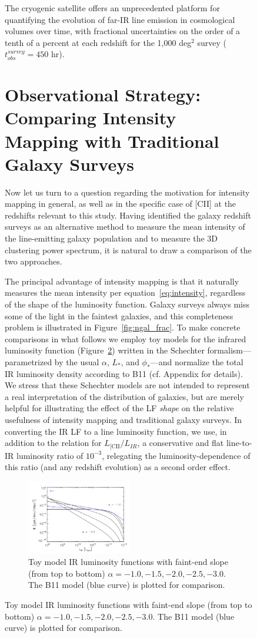 \documentclass[iop,twocolappendix]{emulateapj}
\begin{document}
\begin{figure}[t]
The cryogenic satellite offers an unprecedented platform for quantifying the evolution of far-IR line emission in cosmological volumes over time, with fractional uncertainties on the order of a tenth of a percent at each redshift for the 1,000 deg$^2$ survey ($t_{obs}^{survey} = 450$ hr).

\section{Observational Strategy: Comparing Intensity Mapping with Traditional Galaxy Surveys}

Now let us turn to a question regarding the motivation for intensity mapping in general, as well as in the specific case of [CII] at the redshifts relevant to this study. Having identified the galaxy redshift surveys as an alternative method to measure the mean intensity of the line-emitting galaxy population and to measure the 3D clustering power spectrum, it is natural to draw a comparison of the two approaches. 

The principal advantage of intensity mapping is that it naturally measures the mean intensity per equation~\ref{eq:intensity}, regardless of the shape of the luminosity function. Galaxy surveys always miss some of the light in the faintest galaxies, and this completeness problem is illustrated in Figure~\ref{fig:ngal_frac}. To make concrete comparisons in what follows we employ toy models for the infrared luminosity function (Figure~\ref{fig:schechterfuncs}) written in the Schechter formalism---parametrized by the usual $\alpha$, $L_*$, and $\phi_*$---and normalize the total IR luminosity density according to B11 (cf. Appendix for details). We stress that these Schechter models are not intended to represent a real interpretation of the distribution of galaxies, but are merely helpful for illustrating the effect of the LF \emph{shape} on the relative usefulness of intensity mapping and traditional galaxy surveys. In converting the IR LF to a line luminosity function, we use, in addition to the \citet{spinoglio12} relation for $L_{\textrm{[CII}}/L_{IR}$, a conservative and flat line-to-IR luminosity ratio of $10^{-3}$, relegating the luminosity-dependence of this ratio (and any redshift evolution) as a second order effect. 

\begin{figure}
\centering
\includegraphics[width=0.5\textwidth]{phi_lir_schechter_bethermin11_Lstar1d12_Lmin1d8_Lmax1d13}
\caption{Toy model IR luminosity functions with faint-end slope (from top to bottom) $\alpha=-1.0, -1.5, -2.0, -2.5, -3.0$. The B11 model (blue curve) is plotted for comparison.}
\label{fig:schechterfuncs}
\end{figure}


\end{figure}
\end{document}
